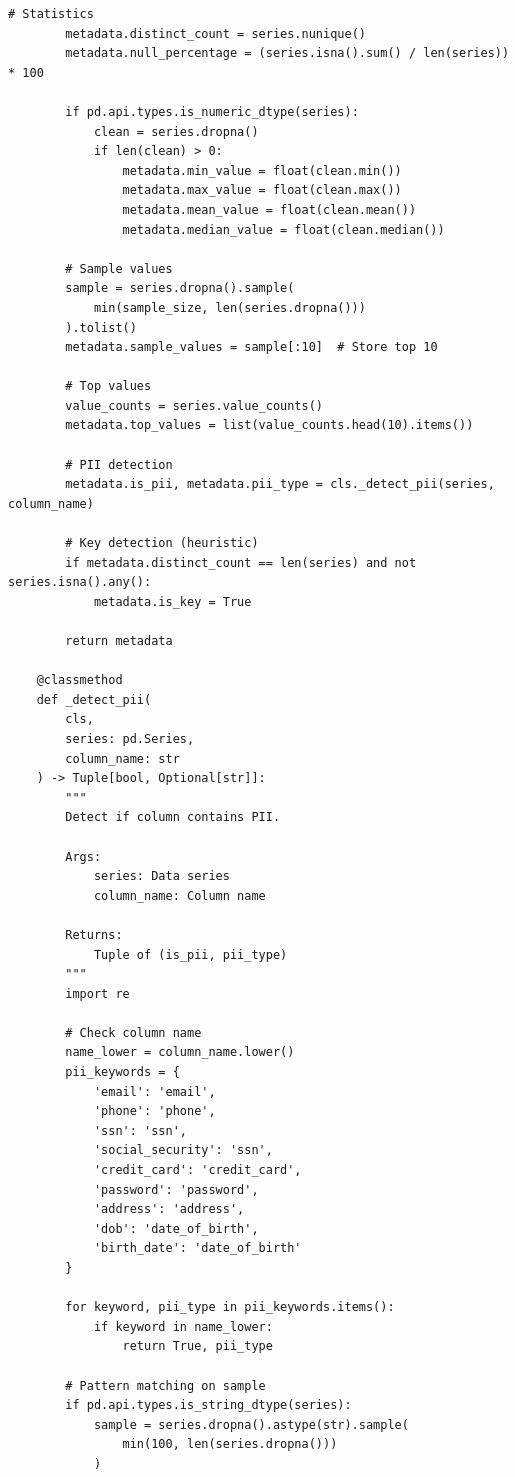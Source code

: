 \begin{lstlisting}[style=python, caption={Enterprise data catalog with automated metadata extraction}]
        # Statistics
        metadata.distinct_count = series.nunique()
        metadata.null_percentage = (series.isna().sum() / len(series)) * 100

        if pd.api.types.is_numeric_dtype(series):
            clean = series.dropna()
            if len(clean) > 0:
                metadata.min_value = float(clean.min())
                metadata.max_value = float(clean.max())
                metadata.mean_value = float(clean.mean())
                metadata.median_value = float(clean.median())

        # Sample values
        sample = series.dropna().sample(
            min(sample_size, len(series.dropna()))
        ).tolist()
        metadata.sample_values = sample[:10]  # Store top 10

        # Top values
        value_counts = series.value_counts()
        metadata.top_values = list(value_counts.head(10).items())

        # PII detection
        metadata.is_pii, metadata.pii_type = cls._detect_pii(series, column_name)

        # Key detection (heuristic)
        if metadata.distinct_count == len(series) and not series.isna().any():
            metadata.is_key = True

        return metadata

    @classmethod
    def _detect_pii(
        cls,
        series: pd.Series,
        column_name: str
    ) -> Tuple[bool, Optional[str]]:
        """
        Detect if column contains PII.

        Args:
            series: Data series
            column_name: Column name

        Returns:
            Tuple of (is_pii, pii_type)
        """
        import re

        # Check column name
        name_lower = column_name.lower()
        pii_keywords = {
            'email': 'email',
            'phone': 'phone',
            'ssn': 'ssn',
            'social_security': 'ssn',
            'credit_card': 'credit_card',
            'password': 'password',
            'address': 'address',
            'dob': 'date_of_birth',
            'birth_date': 'date_of_birth'
        }

        for keyword, pii_type in pii_keywords.items():
            if keyword in name_lower:
                return True, pii_type

        # Pattern matching on sample
        if pd.api.types.is_string_dtype(series):
            sample = series.dropna().astype(str).sample(
                min(100, len(series.dropna()))
            )


\end{lstlisting}
